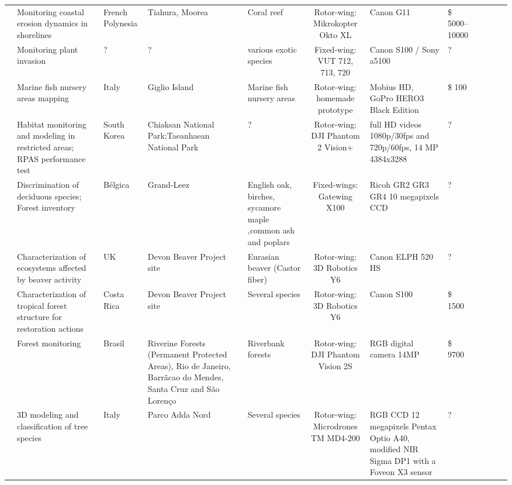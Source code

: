 \begin{landscape}
\begin{longtabu}{p{1cm}p{3cm}p{1cm}Up{2cm}Sp{3cm}Tp{4cm}p{3.5cm}Rp{1cm}}
\cite{casella_drones_2016}  &  Monitoring coastal erosion dynamics in shorelines & French Polynesia & Tiahura, Moorea & Coral reef  & Rotor-wing: Mikrokopter Okto XL & Canon G11  & \$ 5000–10000 \\ 

\cite{mullerova_does_2016}  &  Monitoring plant invasion & ? & ? & various exotic species  & Fixed-wing: VUT 712, 713, 720  & Canon S100 / Sony a5100  & ? \\ 


\cite{ventura_low-cost_2016}  & Marine fish nursery areas mapping  & Italy & Giglio Island & Marine fish nursery areas  & Rotor-wing: homemade prototype & Mobius HD, GoPro HERO3 Black Edition  & \$ 100 \\ 


\cite{ivosevic_use_2015}  & Habitat monitoring and modeling in restricted areas; RPAS performance test & South Korea & Chiaksan National Park;Taeanhaean National Park &  ? & Rotor-wing: DJI Phantom 2 Vision+  & full HD videos 1080p/30fps and 720p/60fps, 14 MP 4384x3288 & ? \\ 
  
\cite{lisein_discrimination_2015}  & Discrimination of deciduous species; Forest inventory & Bélgica & Grand-Leez & English oak, birches, sycamore maple ,common ash and poplars & Fixed-wings: Gatewing X100  & Ricoh GR2 GR3 GR4 10 megapixels CCD  & ?  \\ 
  
\cite{puttock_aerial_2015}  & Characterization of ecosystems affected by beaver activity& UK & Devon Beaver Project site & Eurasian beaver (Castor fiber) & Rotor-wing: 3D Robotics Y6 & Canon ELPH 520 HS  & ?  \\ 
  
\cite{zahawi_using_2015} & Characterization of tropical forest structure for restoration actions & Costa Rica & Devon Beaver Project site & Several species & Rotor-wing: 3D Robotics Y6 & Canon S100  & \$ 1500 \\ 
  
\cite{bustamante_forest_2015}  & Forest monitoring & Brasil & Riverine Forests (Permanent Protected Areas), Rio de Janeiro, Barrãcao do Mendes, Santa Cruz and São Lorenço & Riverbank forests & Rotor-wing: DJI Phantom Vision 2S   & RGB digital camera 14MP & \$ 9700  \\ 
  
\cite{gini_aerial_2012}  & 3D modeling and classification of tree species & Italy & Parco Adda Nord &  Several species &  Rotor-wing: Microdrones TM MD4-200 & RGB CCD 12 megapixels Pentax Optio A40, modified NIR Sigma DP1 with a Foveon X3 sensor  & ?  \\


\end{longtabu}
\end{landscape}
